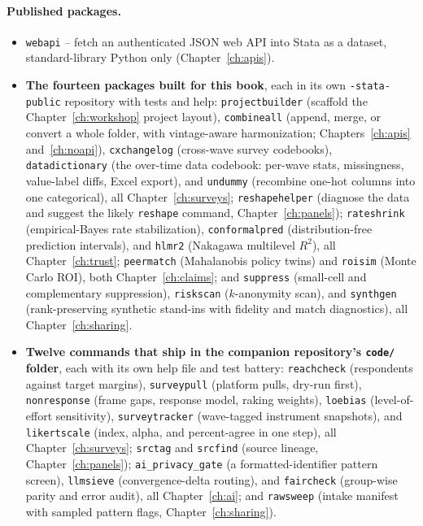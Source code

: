 \paragraph{Published packages.}
\begin{itemize}
    \item \texttt{webapi} -- fetch an authenticated JSON web API into Stata as a dataset, standard-library Python only (Chapter~\ref{ch:apis}).
    \item \textbf{The fourteen packages built for this book}, each in its own \texttt{-stata-public} repository with tests and help: \texttt{projectbuilder} (scaffold the Chapter~\ref{ch:workshop} project layout), \texttt{combineall} (append, merge, or convert a whole folder, with vintage-aware harmonization; Chapters~\ref{ch:apis} and~\ref{ch:noapi}), \texttt{cxchangelog} (cross-wave survey codebooks), \texttt{datadictionary} (the over-time data codebook: per-wave stats, missingness, value-label diffs, Excel export), and \texttt{undummy} (recombine one-hot columns into one categorical), all Chapter~\ref{ch:surveys}; \texttt{reshapehelper} (diagnose the data and suggest the likely \texttt{reshape} command, Chapter~\ref{ch:panels}); \texttt{rateshrink} (empirical-Bayes rate stabilization), \texttt{conformalpred} (distribution-free prediction intervals), and \texttt{hlmr2} (Nakagawa multilevel $R^2$), all Chapter~\ref{ch:trust}; \texttt{peermatch} (Mahalanobis policy twins) and \texttt{roisim} (Monte Carlo ROI), both Chapter~\ref{ch:claims}; and \texttt{suppress} (small-cell and complementary suppression), \texttt{riskscan} ($k$-anonymity scan), and \texttt{synthgen} (rank-preserving synthetic stand-ins with fidelity and match diagnostics), all Chapter~\ref{ch:sharing}.
    \item \textbf{Twelve commands that ship in the companion repository's \texttt{code/} folder}, each with its own help file and test battery: \texttt{reachcheck} (respondents against target margins), \texttt{surveypull} (platform pulls, dry-run first), \texttt{nonresponse} (frame gaps, response model, raking weights), \texttt{loebias} (level-of-effort sensitivity), \texttt{surveytracker} (wave-tagged instrument snapshots), and \texttt{likertscale} (index, alpha, and percent-agree in one step), all Chapter~\ref{ch:surveys}; \texttt{srctag} and \texttt{srcfind} (source lineage, Chapter~\ref{ch:panels}); \texttt{ai\_privacy\_gate} (a formatted-identifier pattern screen), \texttt{llmsieve} (convergence-delta routing), and \texttt{faircheck} (group-wise parity and error audit), all Chapter~\ref{ch:ai}; and \texttt{rawsweep} (intake manifest with sampled pattern flags, Chapter~\ref{ch:sharing}).

\end{itemize}
